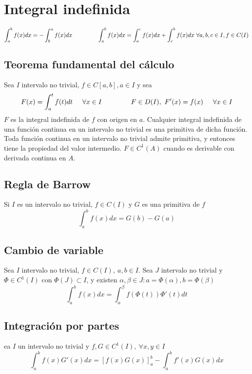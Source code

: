 \section{Integral indefinida}
$$ \int_a^b f(x)dx = -\int_b^a f(x)dx \hspace{1.5cm}
\int_a^b f(x)dx = \int_a^c f(x)dx + \int_c^b f(x)dx \ \forall a,b,c\in I, f\in C(I)$$

\subsection{Teorema fundamental del cálculo}
Sea $I$ intervalo no trivial, $f\in C[a,b], a\in I$ y sea
$$ F(x) = \int_a^t f(t) dt \hspace{0.5cm} \forall x\in I\hspace{1.5cm} F\in D(I), \ F'(x) = f(x) \hspace{0.5cm}\forall x\in I$$
$F$ es la integral indefinida de $f$ con origen en $a$.
Cualquier integral indefinida de una función continua en un intervalo no trivial es una primitiva de dicha función. 
Toda función continua en un intervalo no trivial admite primitiva, y entonces tiene la propiedad del valor intermedio.
$F\in C^1(A)$ cuando es derivable con derivada continua en $A$.

\subsection{Regla de Barrow}
Si $I$ es un intervalo no trivial, $f\in C(I)$ y $G$ es una primitiva de $f$
$$ \int_a^b f(x)dx = G(b)-G(a) $$
\subsection{Cambio de variable}
Sea $I$ intervalo no trivial, $f\in C(I), \ a,b\in I$. Sea $J$ intervalo no trivial y $\Phi\in C^1(I)$ con $\Phi(J)\subset I$, y existen $\alpha,\beta\in J : a=\Phi(\alpha),b=\Phi(\beta)$
$$ \int_a^b f(x)dx = \int_{\alpha}^{\beta} f(\Phi(t))\Phi'(t)dt $$

\subsection{Integración por partes}
ea $I$ un intervalo no trivial y $f,G\in C^1(I), \ \forall x,y\in I$
$$ \int_a^b f(x)G'(x)dx = [f(x)G(x)]_a^b - \int_a^b f'(x)G(x)dx$$